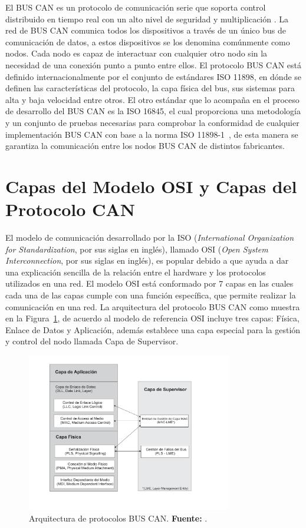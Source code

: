 El BUS CAN es un protocolo de comunicación serie que soporta control distribuido en tiempo real con un alto nivel de seguridad y multiplicación  \cite{PSMR}. 
La red de BUS CAN comunica todos los dispositivos a través de un único bus de comunicación de datos, a estos dispositivos se los denomina comúnmente como nodos. 
Cada nodo es capaz de interactuar con cualquier otro nodo sin la necesidad de una conexión punto a punto entre ellos.
El protocolo BUS CAN está definido internacionalmente por el conjunto de estándares ISO 11898, en dónde se definen las características del protocolo, la capa física del bus, sus sistemas para alta y baja velocidad entre otros. 
El otro estándar que lo acompaña en el proceso de desarrollo del BUS CAN es la ISO 16845, el cual proporciona una  metodología y un conjunto de pruebas necesarias para comprobar la conformidad de cualquier implementación BUS CAN con base a la norma ISO 11898-1~\cite{ISO}, de esta manera se garantiza la comunicación entre los nodos BUS CAN de distintos fabricantes.

\section {Capas del Modelo OSI y Capas del Protocolo CAN}
El modelo de comunicación desarrollado por la ISO (\textit{International Organization for Standardization}, por sus siglas en inglés), llamado OSI (\textit{Open System Interconnection}, por sus siglas en inglés), es popular debido a que ayuda a dar una explicación  sencilla de la relación entre el hardware  y los protocolos utilizados en una red. 
El modelo OSI está conformado por 7 capas en las cuales cada una de las capas cumple con una función específica, que permite realizar la comunicación en una red.
La arquitectura del protocolo BUS CAN como muestra en la Figura~\ref{ABC}, de acuerdo al modelo de referencia OSI incluye tres capas: Física, Enlace de Datos y Aplicación, además establece una capa especial para la gestión y control del nodo llamada Capa de Supervisor. 


\begin{figure}[t]
	\centering
		\includegraphics[width=0.8\textwidth]{./Cap2imagen/protocolocan.pdf}
	\caption[Arquitectura de protocolos BUS CAN.]{Arquitectura de protocolos BUS CAN.\textbf{ Fuente:} \cite{DSEEPC}.}
	\label{ABC} %
\end{figure}

